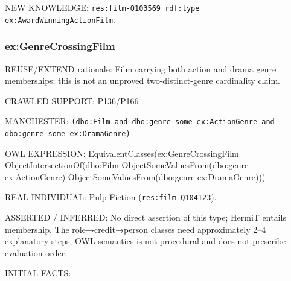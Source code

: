 \documentclass[
  11pt,
]{article}
\begin{document}
NEW KNOWLEDGE:
\texttt{res:\allowbreak{}film\allowbreak{}-\allowbreak{}\allowbreak{}Q103569\allowbreak{} rdf:\allowbreak{}typ\allowbreak{}e ex:\allowbreak{}\allowbreak{}Awa\allowbreak{}rd\allowbreak{}Winnin\allowbreak{}g\allowbreak{}Action\allowbreak{}F\allowbreak{}ilm}.

\subsubsection{\texorpdfstring{ex:\allowbreak{}\allowbreak{}Genre\allowbreak{}\allowbreak{}Crossing\allowbreak{}\allowbreak{}Film}{}}\label{exgenrecrossingfilm}

REUSE/EXTEND rationale: Film carrying both action and drama genre
memberships; this is not an unproved
two-\allowbreak{}dist\allowbreak{}inct-\allowbreak{}gen\allowbreak{}re
cardinality claim.

CRAWLED SUPPORT: P136/P166

MANCHESTER:
\texttt{(dbo:\allowbreak{}\allowbreak{}Fil\allowbreak{}m and db\allowbreak{}o:\allowbreak{}genre \allowbreak{}some ex:\allowbreak{}\allowbreak{}Action\allowbreak{}Ge\allowbreak{}nre and \allowbreak{}dbo:\allowbreak{}genr\allowbreak{}e some e\allowbreak{}x:\allowbreak{}\allowbreak{}Drama\allowbreak{}G\allowbreak{}enre)}

OWL EXPRESSION:
Equivale\allowbreak{}nt\allowbreak{}Classe\allowbreak{}s(ex:\allowbreak{}\allowbreak{}Gen\allowbreak{}re\allowbreak{}Crossi\allowbreak{}ng\allowbreak{}Film
Object\allowbreak{}In\allowbreak{}tersecti\allowbreak{}on\allowbreak{}Of(dbo\allowbreak{}:\allowbreak{}\allowbreak{}Film
Object\allowbreak{}So\allowbreak{}me\allowbreak{}Values\allowbreak{}\allowbreak{}From(dbo\allowbreak{}:\allowbreak{}genre
ex:\allowbreak{}\allowbreak{}Actio\allowbreak{}n\allowbreak{}Genre)
Object\allowbreak{}So\allowbreak{}me\allowbreak{}Values\allowbreak{}\allowbreak{}From(dbo\allowbreak{}:\allowbreak{}genre
ex:\allowbreak{}\allowbreak{}Drama\allowbreak{}\allowbreak{}Genre)))\allowbreak{}

REAL INDIVIDUAL: Pulp Fiction
(\texttt{res:\allowbreak{}film\allowbreak{}-\allowbreak{}\allowbreak{}Q104123\allowbreak{}}).

ASSERTED / INFERRED: No direct assertion of this type; HermiT entails
membership. The role→credit→person classes need
approxim\allowbreak{}ately 2--4 explanatory steps; OWL semantics is not
procedural and does not prescribe evaluation order.

INITIAL FACTS:
\end{document}
